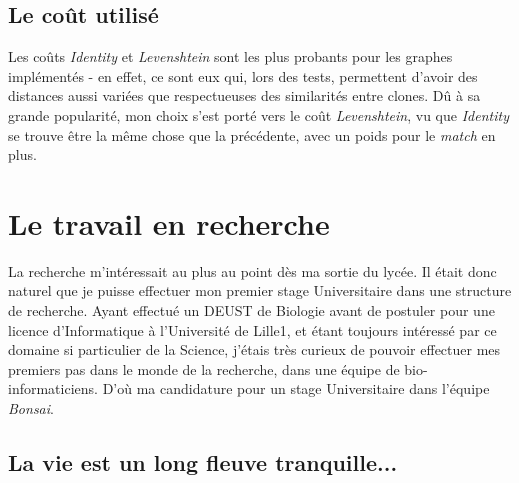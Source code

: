 \documentclass[12pt]{report}
\begin{document}
\begin{spacing}{1.2}
\section{Le coût utilisé}

Les coûts \textit{Identity} et \textit{Levenshtein} sont les plus probants pour les graphes implémentés - en effet, ce sont eux qui, lors des tests, permettent d'avoir des distances aussi variées que respectueuses des similarités entre clones.
\newline
Dû à sa grande popularité, mon choix s'est porté vers le coût \textit{Levenshtein}, vu que \textit{Identity} se trouve être la même chose que la précédente, avec un poids pour le \textit{match} en plus.

\chapter{Le travail en recherche}

La recherche m'intéressait au plus au point dès ma sortie du lycée.
\newline
Il était donc naturel que je puisse effectuer mon premier stage Universitaire dans une structure de recherche. Ayant effectué un DEUST de Biologie avant de postuler pour une licence d'Informatique à l'Université de Lille1, et étant toujours intéressé par ce domaine si particulier de la Science, j'étais très curieux de pouvoir effectuer mes premiers pas dans le monde de la recherche, dans une équipe de bio-informaticiens. D'où ma candidature pour un stage Universitaire dans l'équipe \textit{Bonsai}.

\section{La vie est un long fleuve tranquille...}


\end{spacing}
\end{document}
